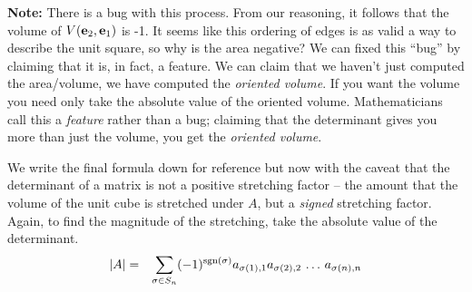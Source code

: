 \documentclass{article}
\begin{document}
{\bf Note:\/} There is a bug with this process. From our reasoning, it follows that
the volume of $V({\bf e}_2, {\bf e}_1)$ is -1. It seems like this ordering 
of edges is as valid a way to
describe the unit square, so why is the area negative? We can fixed this ``bug'' by
claiming that it is, in fact, a feature. We can claim that we haven't just
computed the area/volume,
we have computed the {\em oriented volume\/}.
If you want the volume you need only take the absolute value of the oriented volume.
Mathematicians call this a {\it feature\/} rather than a bug; claiming that the determinant gives
you more than just the volume, you get the {\it oriented volume\/}.

We write the final formula down for reference but now with the caveat that
the determinant of a matrix is not a positive stretching factor -- the amount that the
volume of the unit cube is stretched under $A$, but a {\em signed\/} stretching
factor. Again, to find the magnitude of the stretching, take the absolute value
of the determinant.
\begin{eqnarray}
  |A| & = & \sum_{\sigma \in S_n} (-1)^{{\rm sgn}(\sigma)}
            a_{\sigma(1), 1} a_{\sigma(2),2} \, \ldots \, a_{\sigma(n), n} \label{det_formula}
\end{eqnarray}
\end{document}
